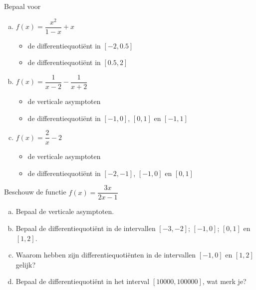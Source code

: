 \documentclass[12pt]{article}
\begin{document}
\begin{oefening}
Bepaal voor\\
\begin{enumerate}[(a)]
  \itemsep1em
  \item $f(x)=\dfrac{x^2}{1-x}+x$\\
  \begin{itemize}
    \item de differentiequotiënt in $[-2,0.5]$
    \item de differentiequotiënt in $[0.5, 2]$
  \end{itemize}
  \item $f(x)=\dfrac{1}{x-2}-\dfrac{1}{x+2}$\\
  \begin{itemize}
    \item de verticale asymptoten
    \item de differentiequotiënt in $[-1,0]$, $[0,1]$ en $[-1,1]$
  \end{itemize}
  \item $f(x)=\dfrac{2}{x}-2$\\
  \begin{itemize}
    \item de verticale asymptoten
    \item de differentiequotiënt in $[-2,-1]$, $[-1,0]$ en $[0,1]$
  \end{itemize}
\end{enumerate}
\end{oefening}

\begin{oefening}
Beschouw de functie $f(x)=\dfrac{3x}{2x-1}$
\begin{enumerate}[(a)]
  \item Bepaal de verticale asymptoten.
  \item Bepaal de differentiequotiënt in de intervallen $[-3,-2]$; $[-1,0]$; $[0,1]$ en $[1,2]$.
  \item Waarom hebben zijn differentiequotiënten in de intervallen $[-1,0]$ en $[1,2]$ gelijk?
  \item Bepaal de differentiequotiënt in het interval $[10000, 100000]$, wat merk je?
\end{enumerate}
\end{oefening}
\end{document}
